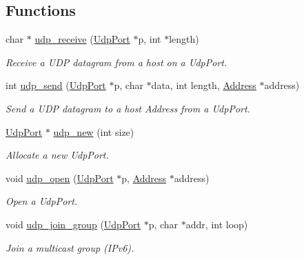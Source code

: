 \subsection*{Functions}
\begin{DoxyCompactItemize}
\item 
char $\ast$ \hyperlink{group__udp_gaf0333276e97bcc889b582368165bd1a8}{udp\+\_\+receive} (\hyperlink{group__udp_ga0c4c532cfe05c936ac56874867ba49e4}{Udp\+Port} $\ast$p, int $\ast$length)
\begin{DoxyCompactList}\small\item\em Receive a U\+DP datagram from a host on a Udp\+Port. \end{DoxyCompactList}\item 
int \hyperlink{group__udp_ga88f203abae4140781b82c1fb50d5a6de}{udp\+\_\+send} (\hyperlink{group__udp_ga0c4c532cfe05c936ac56874867ba49e4}{Udp\+Port} $\ast$p, char $\ast$data, int length, \hyperlink{group__address_ga80f2dcdb3778441e85ac8c9dbb6f324a}{Address} $\ast$address)
\begin{DoxyCompactList}\small\item\em Send a U\+DP datagram to a host Address from a Udp\+Port. \end{DoxyCompactList}\item 
\hyperlink{group__udp_ga0c4c532cfe05c936ac56874867ba49e4}{Udp\+Port} $\ast$ \hyperlink{group__udp_ga948090eea01ee0c584863a5484ffae3e}{udp\+\_\+new} (int size)
\begin{DoxyCompactList}\small\item\em Allocate a new Udp\+Port. \end{DoxyCompactList}\item 
void \hyperlink{group__udp_ga2bcfb527d627ba3162937e2096c4eccf}{udp\+\_\+open} (\hyperlink{group__udp_ga0c4c532cfe05c936ac56874867ba49e4}{Udp\+Port} $\ast$p, \hyperlink{group__address_ga80f2dcdb3778441e85ac8c9dbb6f324a}{Address} $\ast$address)
\begin{DoxyCompactList}\small\item\em Open a Udp\+Port. \end{DoxyCompactList}\item 
void \hyperlink{group__udp_ga774f3267b310c8c530c1cd24136ad911}{udp\+\_\+join\+\_\+group} (\hyperlink{group__udp_ga0c4c532cfe05c936ac56874867ba49e4}{Udp\+Port} $\ast$p, char $\ast$addr, int loop)
\begin{DoxyCompactList}\small\item\em Join a multicast group (I\+Pv6). \end{DoxyCompactList}\end{DoxyCompactItemize}


